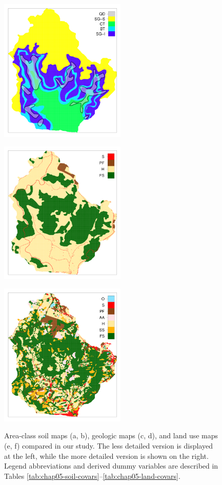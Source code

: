 \begin{figure}[!ht]
\begin{minipage}[b]{63mm}
 \end{minipage}
 \begin{minipage}[b]{63mm}
  \label{fig:chap05-geo-new}
  \centering
  \includegraphics[width=60mm]{fig/chap05FIG3e}
 \end{minipage}
 \begin{minipage}[b]{63mm}
  \label{fig:chap05-land-old}
  \centering
  \includegraphics[width=60mm]{fig/chap05FIG3c}
 \end{minipage}
 \begin{minipage}[b]{63mm}
  \label{fig:chap05-land-new}
  \centering
  \includegraphics[width=60mm]{fig/chap05FIG3f}
 \end{minipage}
 \caption{Area-class soil maps (a, b), geologic maps (c, d), and land use maps (e, f) compared in our study. 
 The less detailed version is displayed at the left, while the more detailed version is shown on the right. 
 Legend abbreviations and derived dummy variables are described in Tables
 \ref{tab:chap05-soil-covars}--\ref{tab:chap05-land-covars}.}
 \label{fig:chap05-cat-covars}
\end{figure}


